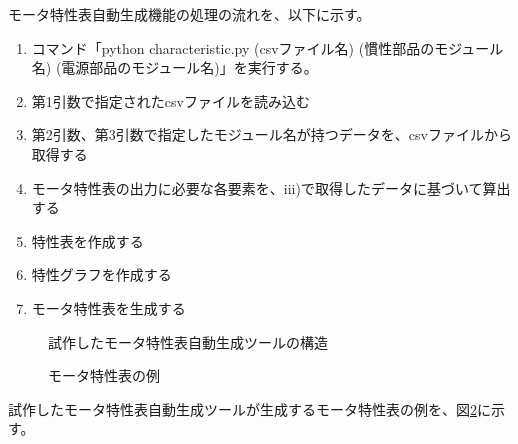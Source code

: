 \documentclass[uplatex, 10pt, a4p]{jsarticle}
\begin{document}
モータ特性表自動生成機能の処理の流れを、以下に示す。
\begin{enumerate}
    \setlength{\itemsep}{0pt}
    \item コマンド「python characteristic.py (csvファイル名) (慣性部品のモジュール名) (電源部品のモジュール名)」を実行する。
    \item 第1引数で指定されたcsvファイルを読み込む
    \item 第2引数、第3引数で指定したモジュール名が持つデータを、csvファイルから取得する
    \item モータ特性表の出力に必要な各要素を、iii)で取得したデータに基づいて算出する
    \item 特性表を作成する
    \item 特性グラフを作成する
    \item モータ特性表を生成する
\end{enumerate}
\begin{figure}[tp]
	\centering
    \caption{試作したモータ特性表自動生成ツールの構造}
	\label{fig:kouzou}
\end{figure}

\begin{figure}[t]
	\centering
    \caption{モータ特性表の例}
	\label{fig:tekiyou_mortoku}
\end{figure}

試作したモータ特性表自動生成ツールが生成するモータ特性表の例を、図\ref{fig:tekiyou_mortoku}に示す。
\end{document}
